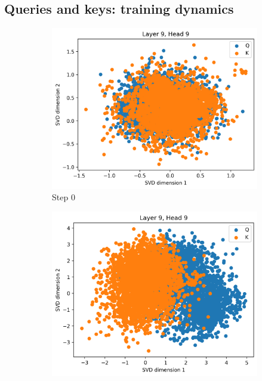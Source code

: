 \subsection{Queries and keys: training dynamics}
\label{sec:qk}
\begin{figure}[ht]
    \centering
    \begin{subfigure}[b]{0.24\linewidth}
         \includegraphics[width=\linewidth]{sources/part_1/anisotropy/imgs/dist_l9h9_s0.png}
         \caption{Step 0}
         \label{fig:dist_qk_s0}
    \end{subfigure}
    \begin{subfigure}[b]{0.24\linewidth}
         \includegraphics[width=\linewidth]{sources/part_1/anisotropy/imgs/dist_l9h9_s40.png}

\end{subfigure}
\end{figure}
